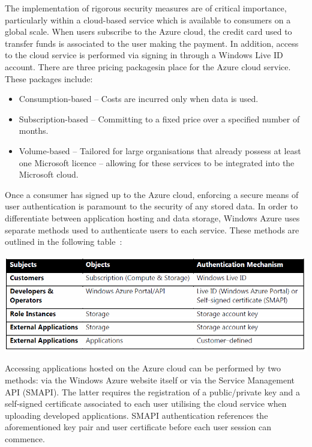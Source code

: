 The implementation of rigorous security measures are of critical importance, particularly within a cloud-based service which is available to consumers on a global scale. When users subscribe to the Azure cloud, the credit card used to transfer funds is associated to the user making the payment. In addition, access to the cloud service is performed via signing in through a Windows Live ID account. 
There are three pricing packages\ftAthree\ftAthreeText in place for the Azure cloud service. These packages include:
\begin{itemize}
\item Consumption-based -- Costs are incurred only when data is used.
\item Subscription-based -- Committing to a fixed price over a specified number of months.
\item Volume-based -- Tailored for large organisations that already possess at least one Microsoft licence -- allowing for these services to be integrated into the Microsoft cloud. 
\end{itemize}

Once a consumer has signed up to the Azure cloud, enforcing a secure means of user authentication is paramount to the security of any stored data. In order to differentiate between application hosting and data storage, Windows Azure uses separate methods used to authenticate users to each service. These methods are outlined in the following table~\cite{AzureSecurity}:

\begin{center}
\includegraphics[scale=0.6]{figs/AzureTable.png} \\
\end{center}

Accessing applications hosted on the Azure cloud can be performed by two methods: via the Windows Azure website itself or via the Service Management API (SMAPI). The latter requires the registration of a public/private key and a self-signed certificate associated to each user utilising the cloud service when uploading developed applications. SMAPI authentication references the aforementioned key pair and user certificate before each user session can commence.

